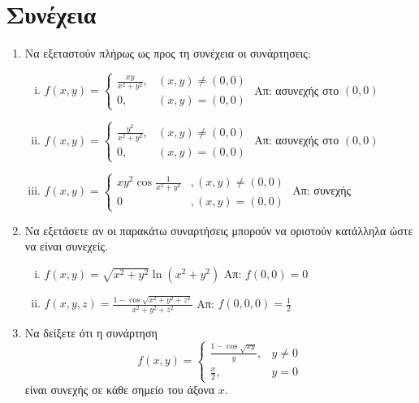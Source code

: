 \pagebreak


\section*{Συνέχεια}

\begin{enumerate}
  \item Να εξεταστούν πλήρως ως προς τη συνέχεια οι συνάρτησεις:
    \begin{enumerate}[(i)]
      \item $ f(x,y) = 
        \begin{cases}
          \frac{ xy }{ x^{2} + y^{2} } ,& (x,y)\neq (0,0) \\
          0 ,& (x,y)= (0,0)
        \end{cases} $
        \hfill Απ: ασυνεχής στο $ (0,0) $ 

      \item $ f(x,y) = 
        \begin{cases} 
          \frac{y^{2}}{x^{2}+y^{2}}, & (x,y) 
          \neq (0,0) \\ 0, & (x,y) = (0,0)
        \end{cases} $
        \hfill Απ: ασυνεχής στο $ (0,0) $ 

      \item $ f(x,y)=
        \begin{cases}
          xy^{2}\cos \frac{1}{x^{2}+y^{2}} &, (x,y)\neq (0,0)\\
          0 &, (x,y)=(0,0)
        \end{cases}
        $ \hfill Απ: συνεχής
    \end{enumerate}

  \item Να εξετάσετε αν οι παρακάτω συναρτήσεις μπορούν να οριστούν κατάλληλα ώστε 
    να είναι συνεχείς.
    \begin{enumerate}[(i)]
      \item $ f(x,y) = \sqrt{x^{2}+y^{2}} \ln{(x^{2}+y^{2})} $ 
        \hfill Απ: $ f(0,0)=0 $ 
      \item $ f(x,y,z) = \frac{1-\cos{\sqrt{x^{2}+y^{2}+z^{2}}}}{x^{2}+y^{2}+z^{2}}$ 
        \hfill Απ: $ f(0,0,0) = \frac{1}{2} $ 
    \end{enumerate}

  \item Να δείξετε ότι η συνάρτηση 
    \[
      f(x,y) = 
      \begin{cases}
        \frac{1- \cos{\sqrt{xy}}}{y}, & y \neq 0 \\ \frac{x}{2}, & y = 0  
      \end{cases}
    \] 
    είναι συνεχής σε κάθε σημείο του άξονα $ x $.
\end{enumerate}


